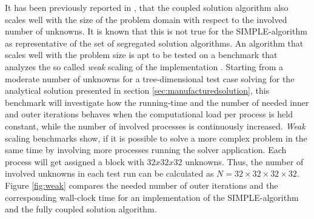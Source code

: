 It has been previously reported in \cite{darwish09,vakilipour12}, that the coupled solution algorithm also scales well with the size of the problem domain with respect to the involved number of unknowns. It is known that this is not true for the SIMPLE-algorithm as representative of the set of segregated solution algorithms. An algorithm that scales well with the problem size is apt to be tested on a benchmark that analyzes the so called \emph{weak} scaling of the implementation \cite{hager11}. Starting from a moderate number of unknowns for a tree-dimensional test case solving for the analytical solution presented in section \ref{sec:manufacturedsolution}, this benchmark will investigate how the running-time and the number of needed inner and outer iterations behaves when the computational load per process is held constant, while the number of involved processes is continuously increased. \emph{Weak} scaling benchmarks show, if it is possible to solve a more complex problem in the same time by involving more processes running the solver application. Each process will get assigned a block with \(32x32x32\) unknowns. Thus, the number of involved unknowns in each test run can be calculated as \( N = 32\times32\times32\times32 \). Figure \ref{fig:weak} compares the needed number of outer iterations and the corresponding wall-clock time for an implementation of the SIMPLE-algorithm and the fully coupled solution algorithm.

